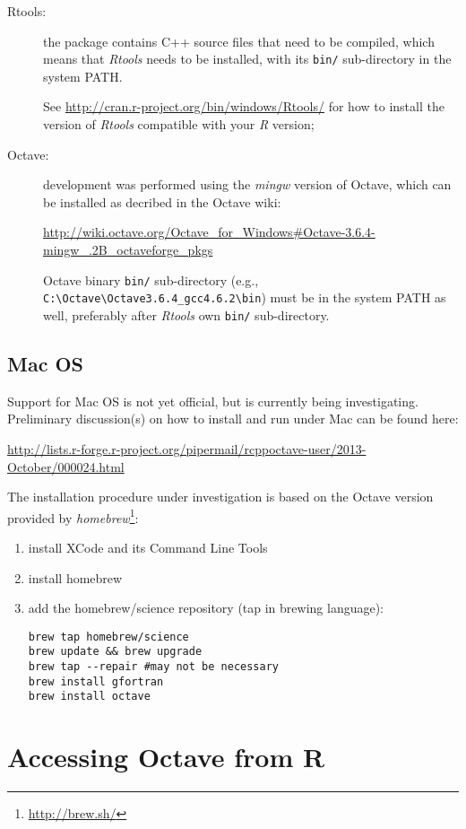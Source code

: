 \documentclass[english,10pt,a4paper]{article}\usepackage[]{graphicx}\usepackage[]{color}
\begin{document}
\begin{description}
  \item[Rtools:] the package contains C++ source files that need to be
  compiled, which means that \emph{Rtools} needs to be installed, with its
  \texttt{bin/} sub-directory in the system PATH.
  
  See \url{http://cran.r-project.org/bin/windows/Rtools/} for how to install the
  version of \emph{Rtools} compatible with your \emph{R} version;
  \item[Octave:] development was performed using the \emph{mingw} version of
  Octave, which can be installed as decribed in the Octave wiki:

\url{http://wiki.octave.org/Octave_for_Windows#Octave-3.6.4-mingw_.2B_octaveforge_pkgs}

  Octave binary \texttt{bin/} sub-directory (e.g.,
  \texttt{C:\textbackslash Octave\textbackslash Octave3.6.4\_gcc4.6.2\textbackslash bin}) must be in the system PATH as well, preferably after
  \emph{Rtools} own \texttt{bin/} sub-directory.
\end{description}

\subsection{Mac OS}
Support for Mac OS is not yet official, but is currently being investigating.
Preliminary discussion(s) on how to install and run under Mac can be found here:

\url{http://lists.r-forge.r-project.org/pipermail/rcppoctave-user/2013-October/000024.html}

The installation procedure under investigation is based on the Octave version
provided by \emph{homebrew}\footnote{\url{http://brew.sh/}}:

\begin{enumerate}
  \item install XCode and its Command Line Tools
  \item install homebrew
  \item add the homebrew/science repository (tap in brewing language):

\begin{verbatim}
brew tap homebrew/science
brew update && brew upgrade
brew tap --repair #may not be necessary
brew install gfortran
brew install octave
\end{verbatim}
\end{enumerate}

\section{Accessing Octave from R}
\end{document}
